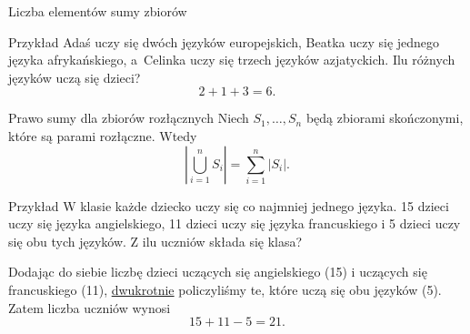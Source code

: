 \documentclass[a4paper,10pt]{beamer}
\begin{document}
	
\begin{frame}{Liczba elementów sumy zbiorów}
	\begin{exampleblock}{Przykład}		
		Adaś uczy się dwóch języków europejskich, Beatka uczy się jednego języka afrykańskiego, a~Celinka uczy się trzech języków azjatyckich. Ilu różnych języków uczą się dzieci?
		$$2+1+3=6.$$
	\end{exampleblock}

	\begin{block}{Prawo sumy dla zbiorów rozłącznych}
		Niech $S_1,\ldots,S_n$ będą zbiorami skończonymi, które są parami rozłączne. Wtedy
		$$\left|\bigcup\limits_{i=1}^nS_i\right|=\sum\limits_{i=1}^n\left|S_i\right|.$$
	\end{block}
	
\end{frame}




\begin{frame}
	
	\begin{exampleblock}{Przykład}		
		W klasie każde dziecko uczy się co najmniej jednego języka. 15 dzieci uczy się języka angielskiego, 11 dzieci uczy się języka francuskiego i 5 dzieci uczy się obu tych języków. Z ilu uczniów składa się klasa?
		
		\vspace{0.3cm}
		Dodając do siebie liczbę dzieci uczących się angielskiego (15) i uczących się francuskiego (11), \underline{dwukrotnie} policzyliśmy te, które uczą się obu języków (5). Zatem liczba uczniów wynosi
		$$15+11-5=21.$$
	\end{exampleblock}
	
\end{frame}
\end{document}
